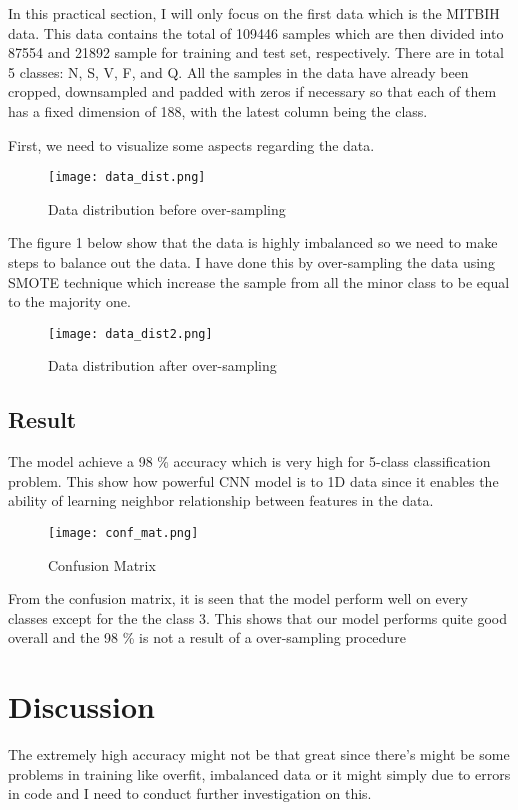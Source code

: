 \documentclass{article}
\begin{document}
\noindent In this practical section, I will only focus on the first data which is the 
MITBIH data. This data contains the total of 109446 samples which are then divided
into 87554 and 21892 sample for training and test set, respectively. There are in
total 5 classes: N, S, V, F, and Q. All the samples in the data have already been
cropped, downsampled and padded with zeros if necessary so that each of them has
a fixed dimension of 188, with the latest column being the class.

First, we need to visualize some aspects regarding the data.

\begin{figure}[h]
    \centering
    \texttt{[image: data\_dist.png]}
    \caption{Data distribution before over-sampling}
\end{figure}

The figure 1 below show that the data is highly imbalanced so we need to 
make steps to balance out the data. I have done this by over-sampling the data
using SMOTE technique which increase the sample from all the minor class to be
equal to the majority one.

\begin{figure}[h]
    \centering
    \texttt{[image: data\_dist2.png]}
    \caption{Data distribution after over-sampling}
\end{figure}

\subsection{Result}
The model achieve a 98 \% accuracy which is very high for 5-class classification
problem. This show how powerful CNN model is to 1D data since it enables
the ability of learning neighbor relationship between features in the data.

\begin{figure}[h]
    \centering
    \texttt{[image: conf\_mat.png]}
    \caption{Confusion Matrix}
\end{figure}
From the confusion matrix, it is seen that the model perform well on every classes except
for the the class 3. This shows that our model performs quite good overall and the 98 \%
is not a result of a over-sampling procedure

\section{Discussion}
The extremely high accuracy might not be that great since there's might be some
problems in training like overfit, imbalanced data or it might simply due to errors
in code and I need to conduct further investigation on this.
\end{document}
